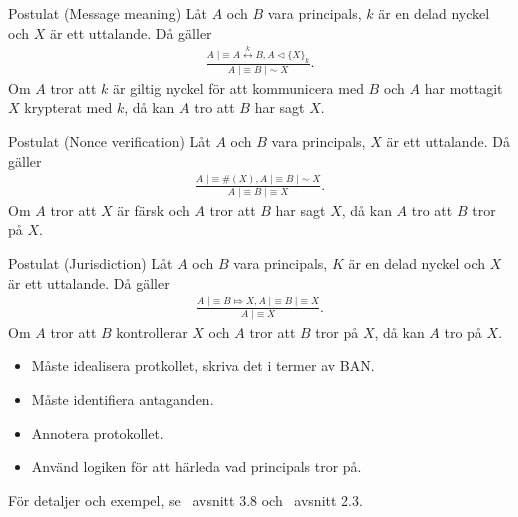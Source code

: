 \documentclass{beamer}
\theoremstyle{definition}
\newenvironment{axiom}[1]{\begin{block}{Postulat (#1)}}{\end{block}}
\theoremstyle{remark}
\DeclareMathOperator{\believes}{|\!\!\!\equiv}
\DeclareMathOperator{\said}{|\!\!\!\sim}
\DeclareMathOperator{\controls}{\Mapsto}
\DeclareMathOperator{\sees}{\lhd}
\newcommand{\fresh}[1]{\#(#1)}
\newcommand{\encrypt}[2]{\{#1\}_{#2}}
\newcommand{\share}[1]{\stackrel{#1}{\leftrightarrow}}
\begin{document}
\begin{frame}
  \begin{axiom}{Message meaning}
    Låt \(A\) och \(B\) vara principals, \(k\) är en delad nyckel och \(X\) är 
    ett uttalande.
    Då gäller
    \begin{align*}
      \frac{A\believes A\share{k} B, A\sees \encrypt{X}{k}}%
        {A\believes B\said X}.
    \end{align*}
    Om \(A\) tror att \(k\) är giltig nyckel för att kommunicera med \(B\) och 
    \(A\) har mottagit \(X\) krypterat med \(k\),
    då kan \(A\) tro att \(B\) har sagt \(X\).
  \end{axiom}
\end{frame}

\begin{frame}
  \begin{axiom}{Nonce verification}
    Låt \(A\) och \(B\) vara principals, \(X\) är ett uttalande.
    Då gäller
    \begin{align*}
      \frac{A\believes \fresh X, A\believes B\said X}%
        {A\believes B\believes X}.
    \end{align*}
    Om \(A\) tror att \(X\) är färsk och \(A\) tror att \(B\) har sagt \(X\),
    då kan \(A\) tro att \(B\) tror på \(X\).
  \end{axiom}
\end{frame}

\begin{frame}
  \begin{axiom}{Jurisdiction}
    Låt \(A\) och \(B\) vara principals, \(K\) är en delad nyckel och \(X\) är 
    ett uttalande.
    Då gäller
    \begin{align*}
      \frac{A\believes B\controls X, A\believes B\believes X}%
        {A\believes X}.
    \end{align*}
    Om \(A\) tror att \(B\) kontrollerar \(X\) och \(A\) tror att \(B\) tror på 
    \(X\),
    då kan \(A\) tro på \(X\).
  \end{axiom}
\end{frame}

\begin{frame}
  \begin{itemize}
    \item Måste idealisera protkollet, skriva det i termer av BAN\@.
    \item Måste identifiera antaganden.
    \item Annotera protokollet.
    \item Använd logiken för att härleda vad principals tror på.
  \end{itemize}
  För detaljer och exempel, se~\cite{Anderson2008sea} avsnitt 3.8 
  och~\cite{Syverson2001tlo} avsnitt 2.3.
\end{frame}
\end{document}
